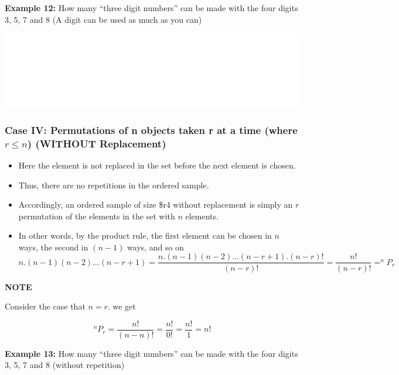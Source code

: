 \documentclass[]{book}
\providecommand{\tightlist}{%
  \setlength{\itemsep}{0pt}\setlength{\parskip}{0pt}}
\begin{document}
\textbf{Example 12:} How many ``three digit numbers'' can be made with the four digits 3, 5, 7 and 8 (A digit can be used as much as you can)

\begin{center}\includegraphics[width=1\linewidth]{figure/box89-1} \end{center}

\hypertarget{case-iv-permutations-of-n-objects-taken-r-at-a-time-where-r-leq-n-without-replacement}{%
\subsubsection{\texorpdfstring{Case IV: Permutations of n objects taken r at a time (where \(r \leq n\)) (WITHOUT Replacement)}{Case IV: Permutations of n objects taken r at a time (where r \textbackslash{}leq n) (WITHOUT Replacement)}}\label{case-iv-permutations-of-n-objects-taken-r-at-a-time-where-r-leq-n-without-replacement}}

\begin{itemize}
\tightlist
\item
  Here the element is not replaced in the set before the next element is chosen.
\item
  Thus, there are no repetitions in the ordered sample.
\item
  Accordingly, an ordered sample of size \$r4 without replacement is simply an \(r\) permutation of the elements in the set with \(n\) elements.
\item
  In other words, by the product rule, the first element can be chosen in \(n\) ways, the second in \((n-1)\) ways, and so on
  \[n.(n-1)(n-2)\dots (n-r+1) = \frac{n.(n-1)(n-2)\dots (n-r+1).(n-r)!}{(n-r)!} = \frac{n!}{(n-r)!} = ^nP_r\]
\end{itemize}

\textbf{NOTE}

Consider the case that \(n = r\). we get

\[^nP_r=\frac{n!}{(n-n)!} = \frac{n!}{0!} = \frac{n!}{1}=n!\]

\textbf{Example 13:} How many ``three digit numbers'' can be made with the four digits 3, 5, 7 and 8 (without repetition)
\end{document}
